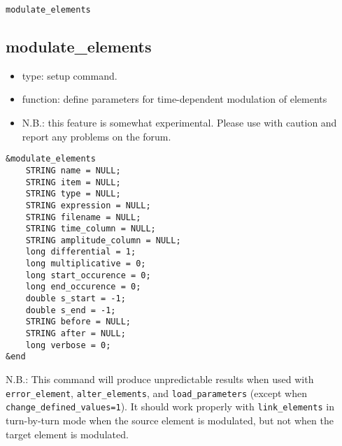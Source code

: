 \documentclass[11pt]{article}
\begin{document}
\begin{latexonly}
\newpage
\begin{center}{\Large\verb|modulate_elements|}\end{center}
\end{latexonly}
\subsection{modulate\_elements\label{subsec:modulateelements}}

\begin{itemize}
\item type: setup command.
\item function: define parameters for time-dependent modulation of elements
\item N.B.: this feature is somewhat experimental.  Please use with caution and report any problems on the forum.
\end{itemize}

\begin{verbatim}
&modulate_elements
    STRING name = NULL;
    STRING item = NULL;
    STRING type = NULL;
    STRING expression = NULL;
    STRING filename = NULL;
    STRING time_column = NULL;
    STRING amplitude_column = NULL;
    long differential = 1;
    long multiplicative = 0;
    long start_occurence = 0;
    long end_occurence = 0;
    double s_start = -1;
    double s_end = -1;
    STRING before = NULL;
    STRING after = NULL;
    long verbose = 0;
&end
\end{verbatim}

N.B.: This command will produce unpredictable results when used with
\verb|error_element|, \verb|alter_elements|, and
\verb|load_parameters| (except when \verb|change_defined_values=1|).
It should work properly with \verb|link_elements| in turn-by-turn mode
when the source element is modulated, but not when the target element
is modulated.
\end{document}
